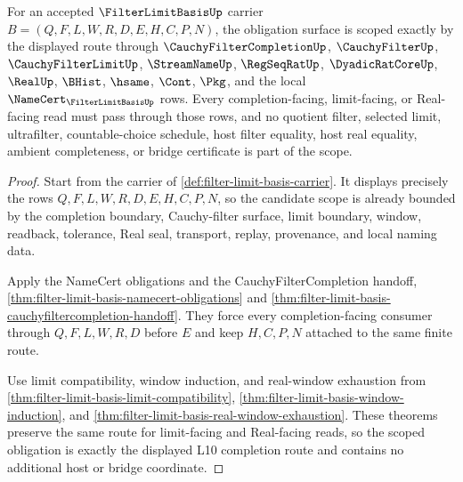 \begin{theorem}
\label{thm:filterlimitbasis-scope-obligation}
For an accepted $\FilterLimitBasisUp$ carrier $B=(Q,F,L,W,R,D,E,H,C,P,N)$, the obligation surface is scoped exactly by the displayed route through $\CauchyFilterCompletionUp$, $\CauchyFilterUp$, $\CauchyFilterLimitUp$, $\StreamNameUp$, $\RegSeqRatUp$, $\DyadicRatCoreUp$, $\RealUp$, $\BHist$, $\hsame$, $\Cont$, $\Pkg$, and the local $\NameCert_{\FilterLimitBasisUp}$ rows. Every completion-facing, limit-facing, or Real-facing read must pass through those rows, and no quotient filter, selected limit, ultrafilter, countable-choice schedule, host filter equality, host real equality, ambient completeness, or bridge certificate is part of the scope.
\end{theorem}
\begin{proof}
Start from the carrier of \autoref{def:filter-limit-basis-carrier}. It displays precisely the rows $Q,F,L,W,R,D,E,H,C,P,N$, so the candidate scope is already bounded by the completion boundary, Cauchy-filter surface, limit boundary, window, readback, tolerance, Real seal, transport, replay, provenance, and local naming data.

Apply the NameCert obligations and the CauchyFilterCompletion handoff, \autoref{thm:filter-limit-basis-namecert-obligations} and \autoref{thm:filter-limit-basis-cauchyfiltercompletion-handoff}. They force every completion-facing consumer through $Q,F,L,W,R,D$ before $E$ and keep $H,C,P,N$ attached to the same finite route.

Use limit compatibility, window induction, and real-window exhaustion from \autoref{thm:filter-limit-basis-limit-compatibility}, \autoref{thm:filter-limit-basis-window-induction}, and \autoref{thm:filter-limit-basis-real-window-exhaustion}. These theorems preserve the same route for limit-facing and Real-facing reads, so the scoped obligation is exactly the displayed L10 completion route and contains no additional host or bridge coordinate.
\end{proof}

